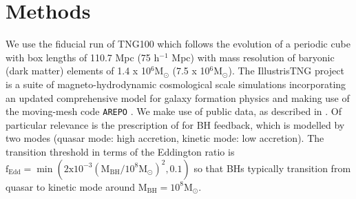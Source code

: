 \documentclass[fleqn,usenatbib]{mnras}
\begin{document}
\section{Methods} \label{sec:methods}
We use the fiducial run of TNG100 which follows the evolution of a periodic cube with box lengths of 110.7 Mpc (75 h$^{-1}$ Mpc) with mass resolution of baryonic (dark matter) elements of 1.4 x 10$^6 \mathrm{M_{\odot}}$ (7.5 x 10$^6 \mathrm{M_{\odot}}$). The IllustrisTNG project \citep{marinacci18,naiman18,nelson18,pillepich18b,springel18} is a suite of magneto-hydrodynamic cosmological scale simulations incorporating an updated comprehensive model for galaxy formation physics \citep[][]{weinberger17,pillepich18a} and making use of the moving-mesh code \texttt{AREPO} \citep{springel10,pakmor11,pakmor13}. We make use of public data, as described in \citet{nelson2019}. Of particular relevance is the prescription of \citet{weinberger17} for BH feedback, which is modelled by two modes (quasar mode: high accretion, kinetic mode: low accretion). The transition threshold in terms of the Eddington ratio is $\mathrm{f_{Edd}= \min ( 2x10^{-3}(M_{BH}/10^8 M_{\odot})^2 , 0.1)}$ so that BHs typically transition from quasar to kinetic mode around $\mathrm{M_{BH} = 10^{8}M_{\odot}}$. 

\end{document}
